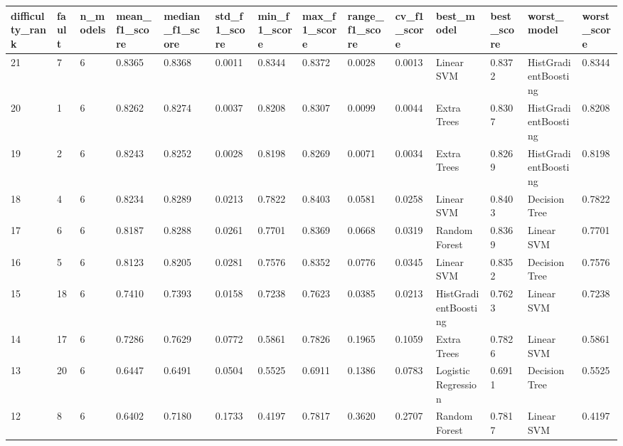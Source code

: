 \begin{tabular}{llllllllllllll}
\toprule
difficulty\_rank & fault & n\_models & mean\_f1\_score & median\_f1\_score & std\_f1\_score & min\_f1\_score & max\_f1\_score & range\_f1\_score & cv\_f1\_score & best\_model & best\_score & worst\_model & worst\_score \\
\midrule
21 & 7 & 6 & 0.8365 & 0.8368 & 0.0011 & 0.8344 & 0.8372 & 0.0028 & 0.0013 & Linear SVM & 0.8372 & HistGradientBoosting & 0.8344 \\
20 & 1 & 6 & 0.8262 & 0.8274 & 0.0037 & 0.8208 & 0.8307 & 0.0099 & 0.0044 & Extra Trees & 0.8307 & HistGradientBoosting & 0.8208 \\
19 & 2 & 6 & 0.8243 & 0.8252 & 0.0028 & 0.8198 & 0.8269 & 0.0071 & 0.0034 & Extra Trees & 0.8269 & HistGradientBoosting & 0.8198 \\
18 & 4 & 6 & 0.8234 & 0.8289 & 0.0213 & 0.7822 & 0.8403 & 0.0581 & 0.0258 & Linear SVM & 0.8403 & Decision Tree & 0.7822 \\
17 & 6 & 6 & 0.8187 & 0.8288 & 0.0261 & 0.7701 & 0.8369 & 0.0668 & 0.0319 & Random Forest & 0.8369 & Linear SVM & 0.7701 \\
16 & 5 & 6 & 0.8123 & 0.8205 & 0.0281 & 0.7576 & 0.8352 & 0.0776 & 0.0345 & Linear SVM & 0.8352 & Decision Tree & 0.7576 \\
15 & 18 & 6 & 0.7410 & 0.7393 & 0.0158 & 0.7238 & 0.7623 & 0.0385 & 0.0213 & HistGradientBoosting & 0.7623 & Linear SVM & 0.7238 \\
14 & 17 & 6 & 0.7286 & 0.7629 & 0.0772 & 0.5861 & 0.7826 & 0.1965 & 0.1059 & Extra Trees & 0.7826 & Linear SVM & 0.5861 \\
13 & 20 & 6 & 0.6447 & 0.6491 & 0.0504 & 0.5525 & 0.6911 & 0.1386 & 0.0783 & Logistic Regression & 0.6911 & Decision Tree & 0.5525 \\
12 & 8 & 6 & 0.6402 & 0.7180 & 0.1733 & 0.4197 & 0.7817 & 0.3620 & 0.2707 & Random Forest & 0.7817 & Linear SVM & 0.4197 \\
\bottomrule
\end{tabular}
